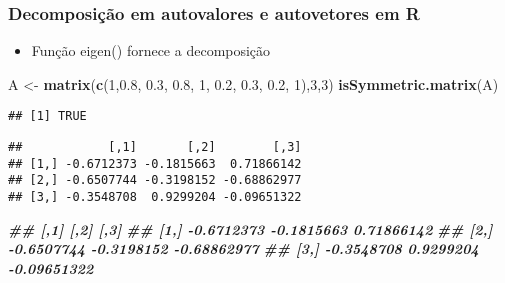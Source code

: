 \documentclass[
]{article}
\newenvironment{Shaded}{\begin{snugshade}}{\end{snugshade}}
\newcommand{\DecValTok}[1]{\textcolor[rgb]{0.00,0.00,0.81}{#1}}
\newcommand{\DocumentationTok}[1]{\textcolor[rgb]{0.56,0.35,0.01}{\textbf{\textit{#1}}}}
\newcommand{\FloatTok}[1]{\textcolor[rgb]{0.00,0.00,0.81}{#1}}
\newcommand{\FunctionTok}[1]{\textcolor[rgb]{0.13,0.29,0.53}{\textbf{#1}}}
\newcommand{\NormalTok}[1]{#1}
\newcommand{\OtherTok}[1]{\textcolor[rgb]{0.56,0.35,0.01}{#1}}
\newcommand{\SpecialCharTok}[1]{\textcolor[rgb]{0.81,0.36,0.00}{\textbf{#1}}}
\providecommand{\tightlist}{%
  \setlength{\itemsep}{0pt}\setlength{\parskip}{0pt}}
\begin{document}
\hypertarget{decomposiuxe7uxe3o-em-autovalores-e-autovetores-em-r}{%
\subsubsection{Decomposição em autovalores e autovetores em
R}\label{decomposiuxe7uxe3o-em-autovalores-e-autovetores-em-r}}

\begin{itemize}
\tightlist
\item
  Função eigen() fornece a decomposição
\end{itemize}

\begin{Shaded}
\begin{Highlighting}[]
\NormalTok{A }\OtherTok{\textless{}{-}} \FunctionTok{matrix}\NormalTok{(}\FunctionTok{c}\NormalTok{(}\DecValTok{1}\NormalTok{,}\FloatTok{0.8}\NormalTok{, }\FloatTok{0.3}\NormalTok{, }\FloatTok{0.8}\NormalTok{, }\DecValTok{1}\NormalTok{,}
\FloatTok{0.2}\NormalTok{, }\FloatTok{0.3}\NormalTok{, }\FloatTok{0.2}\NormalTok{, }\DecValTok{1}\NormalTok{),}\DecValTok{3}\NormalTok{,}\DecValTok{3}\NormalTok{)}
\FunctionTok{isSymmetric.matrix}\NormalTok{(A)}
\end{Highlighting}
\end{Shaded}

\begin{verbatim}
## [1] TRUE
\end{verbatim}

\begin{Shaded}
\end{Shaded}

\begin{verbatim}
##            [,1]       [,2]        [,3]
## [1,] -0.6712373 -0.1815663  0.71866142
## [2,] -0.6507744 -0.3198152 -0.68862977
## [3,] -0.3548708  0.9299204 -0.09651322
\end{verbatim}

\begin{Shaded}
\begin{Highlighting}[]
\DocumentationTok{\#\# [,1] [,2] [,3]}
\DocumentationTok{\#\# [1,] {-}0.6712373 {-}0.1815663 0.71866142}
\DocumentationTok{\#\# [2,] {-}0.6507744 {-}0.3198152 {-}0.68862977}
\DocumentationTok{\#\# [3,] {-}0.3548708 0.9299204 {-}0.09651322}
\end{Highlighting}
\end{Shaded}
\end{document}
